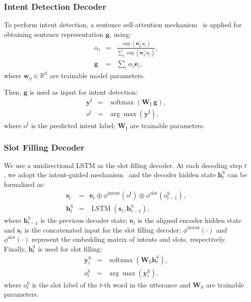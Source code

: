 \documentclass[letterpaper]{article} \usepackage{aaai22}  \usepackage{times}  \usepackage{helvet}  \usepackage{courier}  \usepackage[hyphens]{url}  \usepackage{graphicx} \urlstyle{rm} \def\UrlFont{\rm}  \usepackage{natbib}  \usepackage{caption} \DeclareCaptionStyle{ruled}{labelfont=normalfont,labelsep=colon,strut=off} \frenchspacing  \setlength{\pdfpagewidth}{8.5in}  \setlength{\pdfpageheight}{11in}  \usepackage{algorithm}
\begin{document}
\subsubsection{Intent Detection Decoder}
To perform intent detection, a sentence self-attention mechanism~\citep{zhong-etal-2018-global} is applied for obtaining sentence representation $\mathbf{g}$, using:
\begin{eqnarray}
    \alpha_{i} &=& \frac{\operatorname{exp}\left( \mathbf{w}_\mathrm{g}^\top \mathbf{e}_i \right)}{\sum_{j} \operatorname{exp}\left( \mathbf{w}_\mathrm{g}^\top \mathbf{e}_j \right)}, \\
    \mathbf{g} &=& \sum\nolimits_{i} \alpha_{i} \mathbf{e}_i,
\end{eqnarray}
where $\mathbf{w}_g \in \mathbb{R}^{d} $ are trainable model parameters.

Then, $\mathbf{g}$ is used as input for intent detection:
\begin{eqnarray}
    {\mathbf{y}}^{\mathrm{I}} &=& \operatorname{softmax}\left({\mathbf{W}}_{\mathrm{I}} \ \mathbf{g} \right), \label{eq:intent} \\
    {o}^{\mathrm{I}} &=& \arg \max ({\mathbf{y}}^{\mathrm{I}}),
\end{eqnarray}
where ${o}^{\mathrm{I}}$ is the predicted intent label; $\mathbf{W}_{\mathrm{I}}$ are trainable parameters. 

\subsubsection{Slot Filling Decoder}
We use a unidirectional LSTM as the slot filling decoder.
At each decoding step $t$, we adopt the intent-guided mechanism~\citep{qin-etal-2019-stack} and the decoder hidden state $ \mathbf{h}^{\mathrm{S}}_t $  can be formalized as:
\begin{eqnarray}
    \mathbf{s}_t &=& \mathbf{e}_t \oplus \phi^{\text{intent}} \left({o}^{\mathrm{I}} \right) \oplus \phi^{\text{slot}}\left({o}^{\mathrm{S}}_{t-1}\right), \\
    {\mathbf{h}}_{t}^{\mathrm{S}} &=& \operatorname{LSTM} \left(\mathbf{s}_t,\mathbf{h}^{\mathrm{S}}_{t-1} \right),
\end{eqnarray}
where ${\mathbf{h}}_{t-1}^{\mathrm{S}}$ is the previous decoder state;
$\mathbf{e}_t$ is the aligned encoder hidden state
and $\mathbf{s}_t$ is the concatenated input for the slot filling decoder; $\phi^{\text{intent}}\left(\cdot\right)$ and $\phi^{\text{slot}}\left(\cdot\right)$ represent the embedding matrix of intents and slots, respectively. 
Finally, $\mathbf{h}^{\mathrm{S}}_{t}$ is used for slot filling:
\begin{eqnarray}
    {\mathbf{y}}_{t}^{\mathrm{S}} &=& \operatorname{softmax} \left({\mathbf{W}}_{\mathrm{S}} {\mathbf{h}}_{t}^{\mathrm{S}}\right),\label{eq:slot} \\
    {o}_{t}^{\mathrm{S}} &=& \arg \max ({\mathbf{y}}_{t}^{\mathrm{S}}),
\end{eqnarray}
where ${o}_{t}^{\mathrm{S}}$ is the slot label of the $t$-th word in the utterance and $\mathbf{W}_{\mathrm{S}}$ are trainable parameters.
\end{document}
